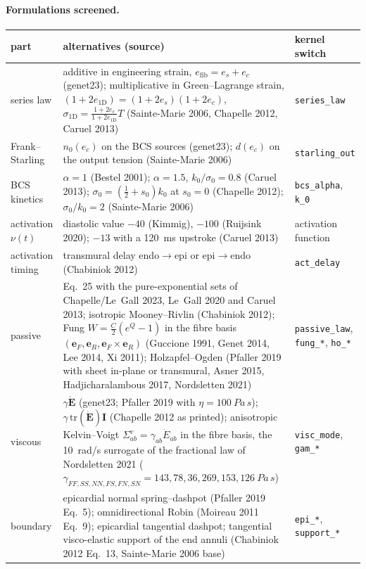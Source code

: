 \documentclass[10pt]{article}
\begin{document}
\paragraph{Formulations screened.}
\begin{center}\footnotesize\begin{tabular}{P{2.1cm}P{8.9cm}P{4.6cm}}
\toprule
part & alternatives (source) & kernel switch \\ \midrule
series law & additive in engineering strain, $e_\text{fib}=e_s+e_c$ (genet23); multiplicative in
Green--Lagrange strain, $(1{+}2e_\text{1D})=(1{+}2e_s)(1{+}2e_c)$,
$\sigma_\text{1D}=\frac{1+2e_c}{1+2e_\text{1D}}T$ (Sainte-Marie 2006, Chapelle 2012, Caruel 2013)
& \texttt{series\_law} \\
Frank--Starling & $n_0(e_c)$ on the BCS sources (genet23); $d(e_c)$ on the output tension
(Sainte-Marie 2006) & \texttt{starling\_out} \\
BCS kinetics & $\alpha=1$ (Bestel 2001); $\alpha=1.5$, $k_0/\sigma_0=0.8$ (Caruel 2013);
$\sigma_0=(\frac12+s_0)k_0$ at $s_0=0$ (Chapelle 2012); $\sigma_0/k_0=2$ (Sainte-Marie 2006)
& \texttt{bcs\_alpha}, \texttt{k\_0} \\
activation $\nu(t)$ & diastolic value $-40$ (Kimmig), $-100$ (Ruijsink 2020); $-13$ with a
\SI{120}{ms} upstroke (Caruel 2013) & activation function \\
activation timing & transmural delay endo$\to$epi or epi$\to$endo (Chabiniok 2012) &
\texttt{act\_delay} \\
passive & Eq.~25 with the pure-exponential sets of Chapelle/Le~Gall 2023, Le~Gall 2020 and
Caruel 2013; isotropic Mooney--Rivlin (Chabiniok 2012); Fung
$W=\frac C2(e^Q-1)$ in the fibre basis $(\mathbf e_F,\mathbf e_R,\mathbf e_F{\times}\mathbf e_R)$
(Guccione 1991, Genet 2014, Lee 2014, Xi 2011); Holzapfel--Ogden (Pfaller 2019 with sheet in-plane or
transmural, Asner 2015, Hadjicharalambous 2017, Nordsletten 2021) &
\texttt{passive\_law}, \texttt{fung\_*}, \texttt{ho\_*} \\
viscous & $\gamma\dot{\mathbf E}$ (genet23; Pfaller 2019 with $\eta=\SI{100}{Pa\,s}$);
$\gamma\,\mathrm{tr}(\dot{\mathbf E})\mathbf I$ (Chapelle 2012 as printed); anisotropic
Kelvin--Voigt $\Sigma^v_{ab}=\gamma_{ab}\dot E_{ab}$ in the fibre basis, the \SI{10}{rad/s}
surrogate of the fractional law of Nordsletten 2021 ($\gamma_{FF,SS,NN,FS,FN,SN}=143, 78, 36, 269,
153, \SI{126}{Pa\,s}$) & \texttt{visc\_mode}, \texttt{gam\_*} \\
boundary & epicardial normal spring--dashpot (Pfaller 2019 Eq.~5); omnidirectional Robin
(Moireau 2011 Eq.~9); epicardial tangential dashpot; tangential visco-elastic support of the
end annuli (Chabiniok 2012 Eq.~13, Sainte-Marie 2006 base) & \texttt{epi\_*},
\texttt{support\_*} \\ \bottomrule
\end{tabular}\end{center}
\end{document}
